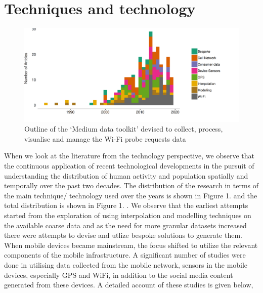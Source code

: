 \section{Techniques and technology}

\begin{figure}
  \includegraphics{images/literature-tech-timeline.png}
  \caption{Outline of the `Medium data toolkit' devised to collect, process, visualise and manage the Wi-Fi probe requests data}
  \label{figure:literature:tech:timeline}
\end{figure}

When we look at the literature from the technology perspective, we observe that the continuous application of recent technological developments in the pursuit of understanding the distribution of human activity and population spatially and temporally over the past two decades.
The distribution of the research in terms of the main technique/ technology used over the years is shown in Figure 1.
 and the total distribution is shown in Figure 1.
. We observe that the earliest attempts started from the exploration of using interpolation and modelling techniques on the available coarse data and as the need for more granular datasets increased there were attempts to devise and utlize bespoke solutions to generate them.
When mobile devices became mainstream, the focus shifted to utilize the relevant components of the mobile infrastructure.
A significant number of studies were done in utilising data collected from the mobile network, sensors in the mobile devices, especially GPS and WiFi, in addition to the social media content generated from these devices.
A detailed account of these studies is given below,


